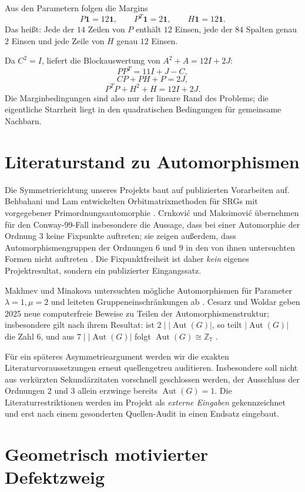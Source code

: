 \documentclass[11pt,a4paper]{article}
\newcommand{\Aut}{\operatorname{Aut}}
\begin{document}
Aus den Parametern folgen die Margins
\[
P\mathbf 1=12\mathbf 1,\qquad
P^T\mathbf 1=2\mathbf 1,\qquad
H\mathbf 1=12\mathbf 1.
\]
Das heißt: Jede der $14$ Zeilen von $P$ enthält $12$ Einsen, jede der $84$ Spalten genau $2$ Einsen und jede Zeile von $H$ genau $12$ Einsen.

Da $C^2=I$, liefert die Blockauswertung von $A^2+A=12I+2J$:
\[
\boxed{PP^T=11I+J-C,}
\]
\[
\boxed{CP+PH+P=2J,}
\]
\[
\boxed{P^TP+H^2+H=12I+2J.}
\]
Die Marginbedingungen sind also nur der lineare Rand des Problems; die eigentliche Starrheit liegt in den quadratischen Bedingungen für gemeinsame Nachbarn.

\section{Literaturstand zu Automorphismen}

Die Symmetrierichtung unseres Projekts baut auf publizierten Vorarbeiten auf. Behbahani und Lam entwickelten Orbitmatrixmethoden für SRGs mit vorgegebener Primordnungsautomorphie \cite{BehbahaniLam2011}. Crnković und Maksimović übernehmen für den Conway-99-Fall insbesondere die Aussage, dass bei einer Automorphie der Ordnung $3$ keine Fixpunkte auftreten; sie zeigen außerdem, dass Automorphismengruppen der Ordnungen $6$ und $9$ in den von ihnen untersuchten Formen nicht auftreten \cite{CrnkovicMaksimovic2020}. Die Fixpunktfreiheit ist daher \emph{kein} eigenes Projektresultat, sondern ein publizierter Eingangssatz.

Makhnev und Minakova untersuchten mögliche Automorphismen für Parameter $\lambda=1,\mu=2$ und leiteten Gruppeneinschränkungen ab \cite{MakhnevMinakova2004}. Cesarz und Woldar geben 2025 neue computerfreie Beweise zu Teilen der Automorphismenstruktur; insbesondere gilt nach ihrem Resultat: ist $2\mid|\Aut(G)|$, so teilt $|\Aut(G)|$ die Zahl $6$, und aus $7\mid|\Aut(G)|$ folgt $\Aut(G)\cong\mathbb Z_7$ \cite{CesarzWoldar2025}.

Für ein späteres Asymmetrieargument werden wir die exakten Literaturvoraussetzungen erneut quellengetreu auditieren. Insbesondere soll nicht aus verkürzten Sekundärzitaten vorschnell geschlossen werden, der Ausschluss der Ordnungen $2$ und $3$ allein erzwinge bereits $\Aut(G)=1$. Die Literaturrestriktionen werden im Projekt als \emph{externe Eingaben} gekennzeichnet und erst nach einem gesonderten Quellen-Audit in einen Endsatz eingebaut.

\section{Geometrisch motivierter Defektzweig}
\end{document}
